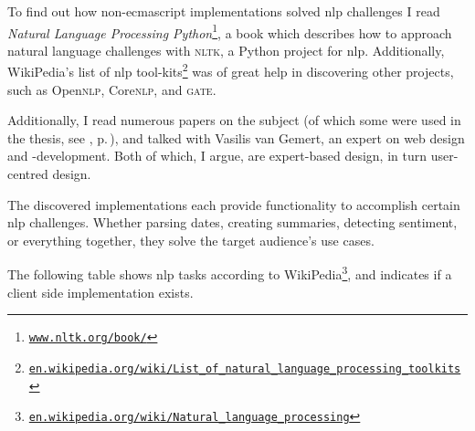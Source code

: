 To find out how non-\gls{ecmascript} implementations solved \gls{nlp}
  challenges I read \emph{Natural Language Processing
  Python}\footnote{
    \href{http://www.nltk.org/book/}{\nolinkurl{www.nltk.org/book/}}
  }, a book which describes how to approach natural language
  challenges with \textsc{nltk}, a Python project for \gls{nlp}.
Additionally, WikiPedia's list of \gls{nlp} tool-kits\footnote{
    \href{http://en.wikipedia.org/wiki/List_of_natural_language_processing_toolkits}{\nolinkurl{en.wikipedia.org/wiki/List_of_natural_language_processing_toolkits}}
  } was of great help in discovering other projects, such as Open\textsc{nlp},
  Core\textsc{nlp}, and \textsc{gate}.

Additionally, I read numerous papers on the subject (of which some were used in
  the thesis, see \bibname, p.\,\pageref{works-cited}), and talked with
  Vasilis van Gemert, an expert on web design and -development.
Both of which, I argue, are expert-based design, in turn user-centred
  design.

The discovered implementations each provide functionality to accomplish
  certain \gls{nlp} challenges.
Whether parsing dates, creating summaries, detecting sentiment, or everything
  together, they solve the target audience's use cases.

The following table shows \gls{nlp} tasks according to
  WikiPedia\footnote{
    \href{http://en.wikipedia.org/wiki/Natural_language_processing}{\nolinkurl{en.wikipedia.org/wiki/Natural_language_processing}}
  }, and indicates if a client side implementation exists.
\medskip

